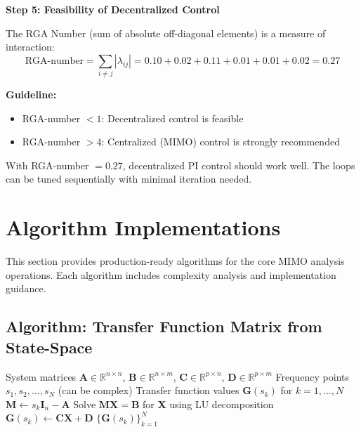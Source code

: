 \textbf{Step 5: Feasibility of Decentralized Control}

The RGA Number (sum of absolute off-diagonal elements) is a measure of interaction:
\begin{equation}
\text{RGA-number} = \sum_{i \neq j} |\lambda_{ij}| = 0.10 + 0.02 + 0.11 + 0.01 + 0.01 + 0.02 = 0.27
\end{equation}

\textbf{Guideline:}
\begin{itemize}
\item RGA-number $< 1$: Decentralized control is feasible
\item RGA-number $> 4$: Centralized (MIMO) control is strongly recommended
\end{itemize}

With RGA-number $= 0.27$, decentralized PI control should work well. The loops can be tuned sequentially with minimal iteration needed.


\section{Algorithm Implementations}
\label{sec:algorithm_implementations}

This section provides production-ready algorithms for the core MIMO analysis operations. Each algorithm includes complexity analysis and implementation guidance.

\subsection{Algorithm: Transfer Function Matrix from State-Space}

\begin{algorithm}[H]
\caption{Transfer Function Matrix Computation}
\label{alg:tf_matrix}
\begin{algorithmic}[1]
\REQUIRE System matrices $\mathbf{A} \in \mathbb{R}^{n \times n}$, $\mathbf{B} \in \mathbb{R}^{n \times m}$, $\mathbf{C} \in \mathbb{R}^{p \times n}$, $\mathbf{D} \in \mathbb{R}^{p \times m}$
\REQUIRE Frequency points $s_1, s_2, \ldots, s_N$ (can be complex)
\ENSURE Transfer function values $\mathbf{G}(s_k)$ for $k = 1, \ldots, N$
\STATE
{}
    \STATE $\mathbf{M} \gets s_k \mathbf{I}_n - \mathbf{A}$
    \STATE Solve $\mathbf{M} \mathbf{X} = \mathbf{B}$ for $\mathbf{X}$ using LU decomposition 
    \STATE $\mathbf{G}(s_k) \gets \mathbf{C}\mathbf{X} + \mathbf{D}$
\ENDFOR
\STATE
\RETURN $\{\mathbf{G}(s_k)\}_{k=1}^N$
\end{algorithmic}
\end{algorithm}

